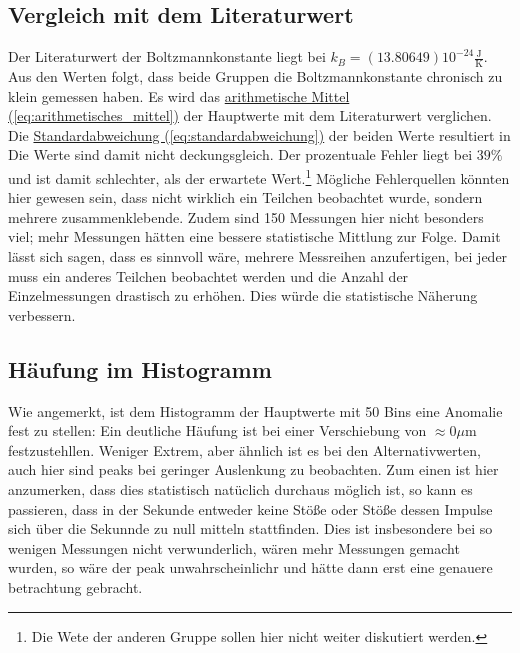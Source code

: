 \subsection{Vergleich mit dem Literaturwert}
Der Literaturwert der Boltzmannkonstante liegt bei $k_B = (13.80649) 10^{-24}\mathrm{\frac{J}{K}}$. Aus den Werten folgt, dass beide Gruppen die Boltzmannkonstante chronisch zu klein gemessen haben. Es wird das \hyperref[eq:arithmetisches_mittel]{arithmetische Mittel (\ref*{eq:arithmetisches_mittel})} der Hauptwerte mit dem Literaturwert verglichen. Die \hyperref[eq:standardabweichung]{Standardabweichung (\ref*{eq:standardabweichung})} der beiden Werte resultiert in
Die Werte sind damit nicht deckungsgleich. Der prozentuale Fehler liegt bei $39\%$ und ist damit schlechter, als der erwartete Wert.\footnote{Die Wete der anderen Gruppe sollen hier nicht weiter diskutiert werden.} Mögliche Fehlerquellen könnten hier gewesen sein, dass nicht wirklich ein Teilchen beobachtet wurde, sondern mehrere zusammenklebende. Zudem sind 150 Messungen hier nicht besonders viel; mehr Messungen hätten eine bessere statistische Mittlung zur Folge. Damit lässt sich sagen, dass es sinnvoll wäre, mehrere Messreihen anzufertigen, bei jeder muss ein anderes Teilchen beobachtet werden und die Anzahl der Einzelmessungen drastisch zu erhöhen. Dies würde die statistische Näherung verbessern.

\subsection{Häufung im Histogramm}
Wie angemerkt, ist dem Histogramm der Hauptwerte mit 50 Bins eine Anomalie fest zu stellen: Ein deutliche Häufung ist bei einer Verschiebung von $\approx 0 \mu$m festzustehllen. Weniger Extrem, aber ähnlich ist es bei den Alternativwerten, auch hier sind peaks bei geringer Auslenkung zu beobachten.
Zum einen ist hier anzumerken, dass dies statistisch natüclich durchaus möglich ist, so kann es passieren, dass in der Sekunde entweder keine Stöße oder Stöße dessen Impulse sich über die Sekunnde zu null mitteln stattfinden. Dies ist insbesondere bei so wenigen Messungen nicht verwunderlich, wären mehr Messungen gemacht wurden, so wäre der peak unwahrscheinlichr und hätte dann erst eine genauere betrachtung gebracht.


